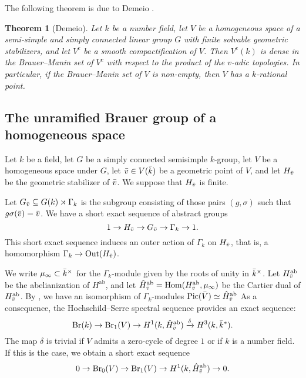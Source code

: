 \documentclass[10pt,letterpaper,twoside]{article}
\renewcommand{\1}{\mathbf{1}}
\newcommand{\Br}{\mathrm{Br}}
\theoremstyle{plain}
\newtheorem{theorem}{Theorem}[section]
\theoremstyle{plain}
\theoremstyle{definition}
\theoremstyle{named}
\theoremstyle{definition}
\begin{document}
The following theorem is due to Demeio \cite{}.

\begin{theorem}[Demeio]
    Let $k$ be a number field, let $V$ be a homogeneous space of a semi-simple and simply connected
    linear group $G$ with finite solvable geometric stabilizers, and let $V^c$ be a smooth
    compactification of $V$. Then $V^c(k)$ is dense in the Brauer–Manin set of $V^c$ with respect to
    the product of the $v$-adic topologies. In particular, if the Brauer--Manin set of $V$ is
    non-empty, then $V$ has a $k$-rational point.
\end{theorem}

\subsection{The unramified Brauer group of a homogeneous space}
Let $k$ be a field, let $G$ be a simply connected semisimple $k$-group, let $V$ be a homogeneous space under $G$, let $\Bar{v}\in V(\Bar{k})$ be a geometric point of $V$, and let $H_{\Bar{v}}$ be the geometric stabilizer of $\Bar{v}$. We suppose that $H_{\Bar{v}}$ is finite.

Let $G_{\Bar{v}} \subseteq G(k) \rtimes \Gamma_k$ is the subgroup consisting of those pairs $(g, \sigma)$ such that $g\sigma(\Bar{v}) = \Bar{v}$. We have a short exact sequence of abstract groups
\[
1 \to H_{\Bar{v}} \to G_{\Bar{v}} \to \Gamma_k \to 1.
\]
This short exact sequence induces an outer action of $\Gamma_k$ on $H_{\Bar{v}}$, that is, a homomorphism $\Gamma_k\to \mathrm{Out}(H_{\Bar{v}})$. 

We write $\mu_{\infty}\subset \Bar{k}^\times$ for the $\Gamma_k$-module given by the roots of unity in $\Bar{k}^\times$. Let $H^{\mathrm{ab}}_{\Bar{v}}$ be the abelianization of  $H^{\mathrm{ab}}$, and let $\hat{H}^{\mathrm{ab}}_{\Bar{v}}= \mathrm{Hom}(H^{\mathrm{ab}}_{\Bar{v}}, \mu_{\infty})$ be the Cartier dual of $H^{\mathrm{ab}}_{\Bar{v}}$. By \cite{}, we have an isomorphism of $\Gamma_k$-modules $\text{Pic}(\Bar{V})\simeq \hat{H}^{\mathrm{ab}}_{\Bar{v}}$ As a consequence, the Hochschild–Serre spectral sequence provides an exact sequence:
\[
\text{Br}(k) \to \text{Br}_1(V) \to H^1(k, \hat{H}^{\mathrm{ab}}_{\Bar{v}}) \xrightarrow{\delta} H^3(k, \bar{k}^*).
\]
The map $\delta$ is trivial if $V$ admits a zero-cycle of degree $1$ or if $k$ is a number field. If this is the case, we obtain a short exact sequence
\[0\to \Br_0(V)\to \Br_1(V)\to H^1(k, \hat{H}^{\mathrm{ab}}_{\Bar{v}})\to 0.\]
\end{document}
